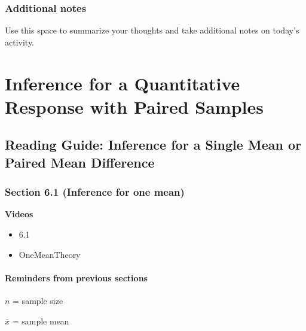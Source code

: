 \documentclass[
]{report}
\providecommand{\tightlist}{%
  \setlength{\itemsep}{0pt}\setlength{\parskip}{0pt}}
\begin{document}
\hypertarget{additional-notes-8}{%
\subsection{Additional notes}\label{additional-notes-8}}

Use this space to summarize your thoughts and take additional notes on today's activity.

\hypertarget{inference-for-a-quantitative-response-with-paired-samples}{%
\chapter{Inference for a Quantitative Response with Paired Samples}\label{inference-for-a-quantitative-response-with-paired-samples}}

\hypertarget{reading-guide-inference-for-a-single-mean-or-paired-mean-difference}{%
\section{Reading Guide: Inference for a Single Mean or Paired Mean Difference}\label{reading-guide-inference-for-a-single-mean-or-paired-mean-difference}}

\hypertarget{section-6.1-inference-for-one-mean}{%
\subsection*{Section 6.1 (Inference for one mean)}\label{section-6.1-inference-for-one-mean}}

\textbf{Videos}

\begin{itemize}
\tightlist
\item
  6.1
\item
  OneMeanTheory
\end{itemize}


\hypertarget{reminders-from-previous-sections-7}{%
\subsubsection*{Reminders from previous sections}\label{reminders-from-previous-sections-7}}

\(n\) = sample size

\(\overline{x}\) = sample mean
\end{document}
